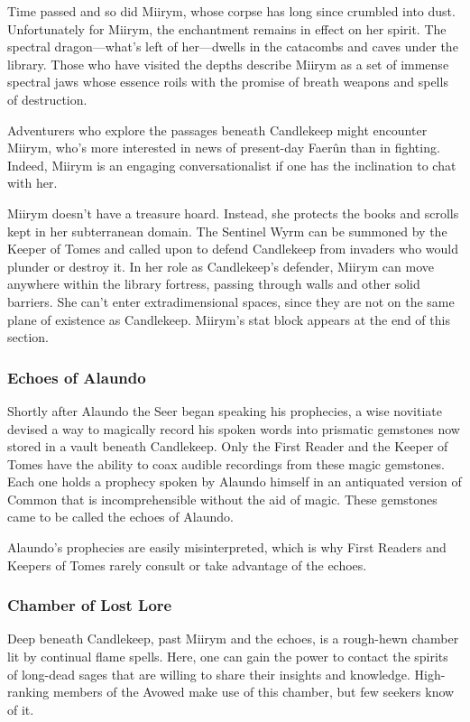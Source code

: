 \documentclass[10pt,a4paper,twoside,bg=print,twocolumn,openany,nodeprecatedcode]{dndbook}
\begin{document}
Time passed and so did Miirym, whose corpse has long since crumbled into dust. Unfortunately for Miirym, the enchantment remains in effect on her spirit. The spectral dragon—what's left of her—dwells in the catacombs and caves under the library. Those who have visited the depths describe Miirym as a set of immense spectral jaws whose essence roils with the promise of breath weapons and spells of destruction.

Adventurers who explore the passages beneath Candlekeep might encounter Miirym, who's more interested in news of present-day Faerûn than in fighting. Indeed, Miirym is an engaging conversationalist if one has the inclination to chat with her.

Miirym doesn't have a treasure hoard. Instead, she protects the books and scrolls kept in her subterranean domain. The Sentinel Wyrm can be summoned by the Keeper of Tomes and called upon to defend Candlekeep from invaders who would plunder or destroy it. In her role as Candlekeep's defender, Miirym can move anywhere within the library fortress, passing through walls and other solid barriers. She can't enter extradimensional spaces, since they are not on the same plane of existence as Candlekeep. Miirym's stat block appears at the end of this section.

\subsubsection{Echoes of Alaundo}
Shortly after Alaundo the Seer began speaking his prophecies, a wise novitiate devised a way to magically record his spoken words into prismatic gemstones now stored in a vault beneath Candlekeep. Only the First Reader and the Keeper of Tomes have the ability to coax audible recordings from these magic gemstones. Each one holds a prophecy spoken by Alaundo himself in an antiquated version of Common that is incomprehensible without the aid of magic. These gemstones came to be called the echoes of Alaundo.

Alaundo's prophecies are easily misinterpreted, which is why First Readers and Keepers of Tomes rarely consult or take advantage of the echoes.

\subsubsection{Chamber of Lost Lore}
Deep beneath Candlekeep, past Miirym and the echoes, is a rough-hewn chamber lit by continual flame spells. Here, one can gain the power to contact the spirits of long-dead sages that are willing to share their insights and knowledge. High-ranking members of the Avowed make use of this chamber, but few seekers know of it.
\end{document}
